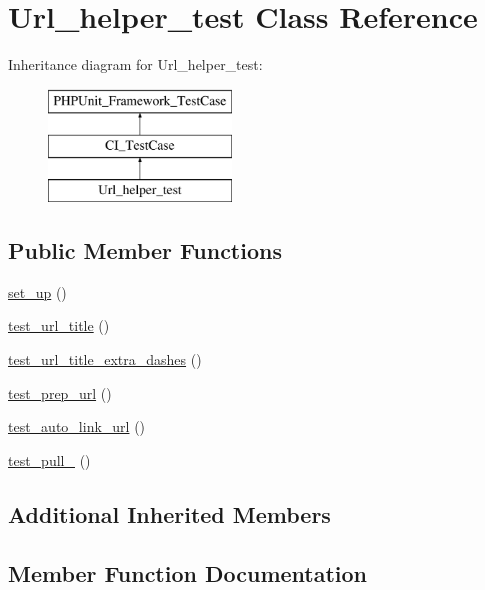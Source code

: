 \hypertarget{class_url__helper__test}{}\section{Url\+\_\+helper\+\_\+test Class Reference}
\label{class_url__helper__test}
Inheritance diagram for Url\+\_\+helper\+\_\+test\+:\begin{figure}[H]
\begin{center}
\leavevmode
\includegraphics[height=3.000000cm]{class_url__helper__test}
\end{center}
\end{figure}
\subsection*{Public Member Functions}
\begin{DoxyCompactItemize}
\item 
\hyperlink{class_url__helper__test_a69829875c8d4b6ce94908445c4155741}{set\+\_\+up} ()
\item 
\hyperlink{class_url__helper__test_a6f34c25deb47296139246d4ccd0a3e8c}{test\+\_\+url\+\_\+title} ()
\item 
\hyperlink{class_url__helper__test_abd0945f8faa12ab6e1f5125de448d259}{test\+\_\+url\+\_\+title\+\_\+extra\+\_\+dashes} ()
\item 
\hyperlink{class_url__helper__test_a5d306c8f47cc5f77e55be5377fd1274f}{test\+\_\+prep\+\_\+url} ()
\item 
\hyperlink{class_url__helper__test_af9ec5f02e741262f95d269f32b53529b}{test\+\_\+auto\+\_\+link\+\_\+url} ()
\item 
\hyperlink{class_url__helper__test_aeb2ffa01a97d9c7eeba4f8ded46a0569}{test\+\_\+pull\+\_} ()
\end{DoxyCompactItemize}
\subsection*{Additional Inherited Members}


\subsection{Member Function Documentation}
\hypertarget{class_url__helper__test_a69829875c8d4b6ce94908445c4155741}{}
